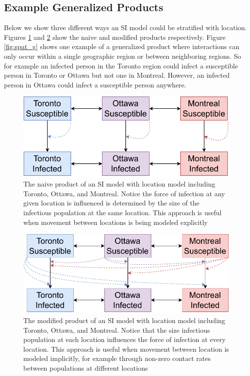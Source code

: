 \documentclass{article}
\theoremstyle{definition}
\begin{document}
\subsection{Example Generalized Products}

Below we show three different ways an SI model could be stratified with location. Figures \ref{fig:spat_n} and \ref{fig:spat_m} show the naive and modified products respectively. Figure \ref{fig:spat_g} shows one example of a generalized product where interactions can only occur within a single geographic region or between neighboring regions. So for example an infected person in the Toronto region could infect a susceptible person in Toronto or Ottawa but not one in Montreal. However, an infected person in Ottawa could infect a susceptible person anywhere. 

\FloatBarrier

\begin{figure}
    \centering
    \includegraphics[width=\textwidth]{images_pdf/Spatial_stratified_SI_Naive.pdf}
    \caption{The naive product of an SI model with location model including Toronto, Ottawa, and Montreal. Notice the force of infection at any given location is influenced is determined by the size of the infectious population at the same location. This approach is useful when movement between locations is being modeled explicitly}
    \label{fig:spat_n}
\end{figure}

\begin{figure}
    \centering
    \includegraphics[width=\textwidth]{images_pdf/Spatial_stratified_SI_Modified.pdf}
    \caption{The modified product of an SI model with location model including Toronto, Ottawa, and Montreal. Notice that the size infectious population at each location influences the force of infection at every location. This approach is useful when movement between location is modeled implicitly, for example through non-zero contact rates between populations at different locations}
    \label{fig:spat_m}
\end{figure}
\end{document}
